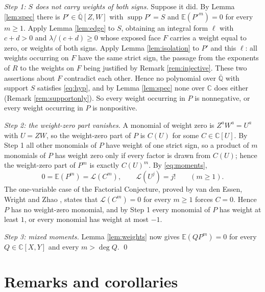 \documentclass[11pt]{amsart}
\theoremstyle{plain}
\theoremstyle{remark}
\numberwithin{equation}{section}
\DeclareMathOperator{\supp}{supp}
\newcommand{\C}{\mathbb{C}}
\newcommand{\Q}{\mathbb{Q}}
\newcommand{\E}{\mathbb{E}}
\newcommand{\Qbar}{\overline{\Q}}
\begin{document}
\smallskip
\noindent\emph{Step 1: $S$ does not carry weights of both signs.} Suppose it
did. By Lemma \ref{lem:spec} there is $P'\in\Qbar[Z,W]$ with $\supp P'=S$ and
$\E(P'^m)=0$ for every $m\ge1$. Apply Lemma \ref{lem:edge} to $S$, obtaining an
integral form $\ell$ with $c+d>0$ and $\lambda/(c+d)\ge0$ whose exposed face $F$
carries a weight equal to zero, or weights of both signs. Apply Lemma
\ref{lem:isolation} to $P'$ and this $\ell$: all weights occurring on $F$ have
the same strict sign, the passage from the exponents of $R$ to the weights on
$F$ being justified by Remark \ref{rem:injective}. These two assertions about
$F$ contradict each other. Hence no polynomial over $\Qbar$ with support $S$
satisfies \eqref{eq:hyp}, and by Lemma \ref{lem:spec} none over $\C$ does
either (Remark \ref{rem:supportonly}). So every weight occurring in $P$ is
nonnegative, or every weight occurring in $P$ is nonpositive.

\smallskip
\noindent\emph{Step 2: the weight-zero part vanishes.} A monomial of weight
zero is $Z^aW^a=U^a$ with $U=ZW$, so the weight-zero part of $P$ is $C(U)$ for
some $C\in\C[U]$. By Step 1 all other monomials of $P$ have weight of one strict
sign, so a product of $m$ monomials of $P$ has weight zero only if every factor
is drawn from $C(U)$; hence the weight-zero part of $P^m$ is exactly $C(U)^m$.
By \eqref{eq:moments},
\[
  0=\E(P^m)=\mathcal L(C^m),\qquad \mathcal L(U^j)=j! \qquad (m\ge1).
\]
The one-variable case of the Factorial Conjecture, proved by van den Essen,
Wright and Zhao \cite[Thm.~4.9]{vdEWZ}, states that $\mathcal L(C^m)=0$ for
every $m\ge1$ forces $C=0$. Hence $P$ has no weight-zero monomial, and by Step
1 every monomial of $P$ has weight at least $1$, or every monomial has weight at
most $-1$.

\smallskip
\noindent\emph{Step 3: mixed moments.} Lemma \ref{lem:weights} now gives
$\E(QP^m)=0$ for every $Q\in\C[X,Y]$ and every $m>\deg Q$. \qed

\section{Remarks and corollaries}\label{sec:remarks}
\end{document}
